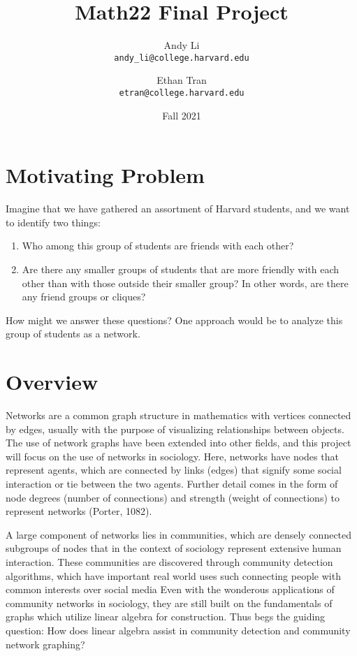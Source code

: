 \documentclass{article}
\title{Math22 Final Project}
\date{Fall 2021}
\author{Andy Li\\ \texttt{andy\_li@college.harvard.edu} \and Ethan Tran\\ \texttt{etran@college.harvard.edu}}
\begin{document}
\maketitle

\pagebreak

\tableofcontents

\section{Motivating Problem}
Imagine that we have gathered an assortment of Harvard students, and we want to identify two things: 
\bigskip
\begin{enumerate}
  \item Who among this group of students are friends with each other?
  \item Are there any smaller groups of students that are more friendly with each other than with those outside their smaller group? 
        In other words, are there any friend groups or cliques?
\end{enumerate}
\bigskip

How might we answer these questions? One approach would be to analyze this group of students as a network.

\section*{Overview}
Networks are a common graph structure in mathematics with vertices connected by edges, usually with the purpose of visualizing relationships between objects.
The use of network graphs have been extended into other fields, and this project will focus on the use of networks in sociology.
Here, networks have nodes that represent agents, which are connected by links (edges) that signify some social interaction or tie between the two agents.
Further detail comes in the form of node degrees (number of connections) and strength (weight of connections) to represent networks (Porter, 1082). 
 
A large component of networks lies in communities, which are densely connected subgroups of nodes that in the context of sociology represent extensive human interaction.
These communities are discovered through community detection algorithms, which have important real world uses such connecting people with common interests over social media
Even with the wonderous applications of community networks in sociology, they are still built on the fundamentals of graphs which utilize linear algebra for construction. 
Thus begs the guiding question:
How does linear algebra assist in community detection and community network graphing?
\end{document}
